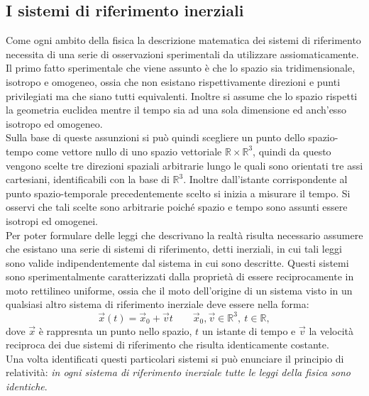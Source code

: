 \subsection{I sistemi di riferimento inerziali}
Come ogni ambito della fisica la descrizione matematica dei sistemi di riferimento necessita di una serie di osservazioni sperimentali da utilizzare assiomaticamente.\\

Il primo fatto sperimentale che viene assunto è che lo spazio sia tridimensionale, isotropo e omogeneo, ossia che non esistano rispettivamente direzioni e punti privilegiati ma che siano tutti equivalenti. Inoltre si assume che lo spazio rispetti la 
geometria euclidea mentre il tempo sia ad una sola dimensione ed anch'esso isotropo ed omogeneo.\\
Sulla base di queste assunzioni si può quindi scegliere un punto dello spazio-tempo come 
vettore nullo di uno spazio vettoriale 
$\mathbb{R}\times\mathbb{R}^3$, quindi da questo vengono scelte tre direzioni spaziali arbitrarie lungo le quali sono orientati tre assi cartesiani, identificabili con la base di $\mathbb{R}^3$. 
Inoltre dall'istante corrispondente al punto spazio-temporale precedentemente scelto si inizia a misurare il tempo. Si osservi che tali scelte sono arbitrarie poiché spazio e tempo sono assunti essere isotropi ed omogenei.\\

Per poter formulare delle leggi che descrivano la realtà risulta necessario assumere che esistano una serie di sistemi di riferimento, detti inerziali, in cui tali leggi sono valide indipendentemente dal sistema in cui sono descritte. Questi sistemi sono sperimentalmente caratterizzati dalla proprietà di essere reciprocamente in moto rettilineo uniforme, ossia che il moto dell'origine di un sistema visto in un qualsiasi altro sistema di riferimento inerziale deve essere nella forma: 
\begin{equation}
	\vec x(t)=\vec x_0+\vec vt \qquad \vec x_0,\vec v\in \mathbb{R}^3, \ t\in\mathbb{R},
\end{equation}
dove $\vec x$ è rappresnta un punto nello spazio, $t$ un istante di tempo e $\vec v$ la velocità reciproca dei due sistemi di riferimento che risulta identicamente costante.\\
Una volta identificati questi particolari sistemi  si può enunciare il principio di relatività: \emph{in ogni sistema di riferimento inerziale tutte le leggi della fisica sono identiche}.\\

